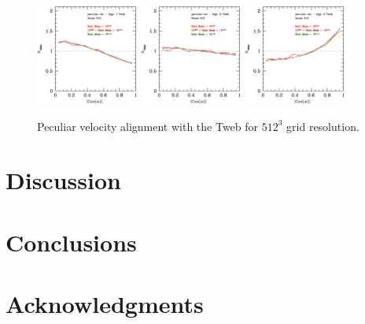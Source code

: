 \documentclass[usenatbib]{mn2e}
\begin{document}
\begin{figure}
\includegraphics[width=0.30\textwidth]{../plot2/Vel/512_vel_T1.ps}
\includegraphics[width=0.30\textwidth]{../plot2/Vel/512_vel_T2.ps}
\includegraphics[width=0.30\textwidth]{../plot2/Vel/512_vel_T3.ps}
\caption{Peculiar velocity alignment with the Tweb for $512^3$ grid resolution.}
\end{figure}



\section{Discussion}
\label{sec:discussion}


\section{Conclusions}
\label{sec:conclusions}


\section*{Acknowledgments} 


 
\end{document}

